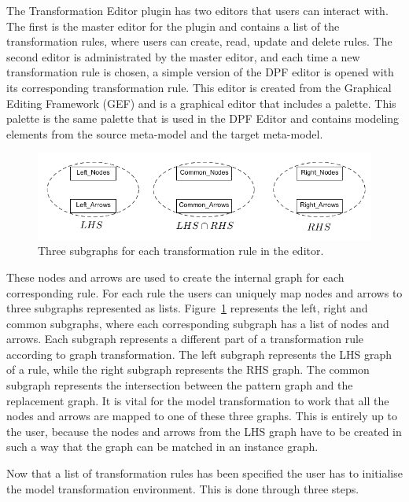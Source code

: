 The Transformation Editor plugin has two editors that users can interact with.
The first is the master editor for the plugin and contains a list of the
transformation rules, where users can create, read, update and delete rules. The
second editor is administrated by the master editor, and each time a new
transformation rule is chosen, a simple version of the DPF editor is opened
with its corresponding transformation rule. This editor is created from the 
Graphical Editing Framework (GEF) and is a graphical editor that includes a
palette. This palette is the same palette that is used in the DPF Editor and
contains modeling elements from the source meta-model and the target meta-model.

\begin{figure}[H]
	\centering
	\includegraphics[scale=0.7]{./Figures/left_common_right.png}
	\caption[The three subgraphs for a transformation rule.]
	{Three subgraphs for each transformation rule in the editor.}
	\label{fig:lists_editor}
\end{figure}

These nodes and arrows are used to create the internal graph for each
corresponding rule. For each rule the users can uniquely map nodes and arrows to
three subgraphs represented as lists. Figure~\ref{fig:lists_editor} represents
the left, right and common subgraphs, where each corresponding subgraph
has a list of nodes and arrows. Each subgraph represents a different part of a
transformation rule according to graph transformation. The left subgraph
represents the LHS graph of a rule, while the right subgraph represents the RHS
graph. The common subgraph represents the intersection between the pattern
graph and the replacement graph. It is vital for the model transformation to
work that all the nodes and arrows are mapped to one of these three graphs.
This is entirely up to the user, because the nodes and arrows from the LHS
graph have to be created in such a way that the graph can be matched in an
instance graph.

Now that a list of transformation rules has been specified the user has to
initialise the model transformation environment. This is done through three
steps. 

